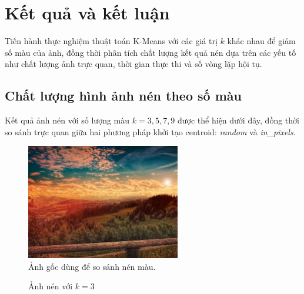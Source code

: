 \section{Kết quả và kết luận}

Tiến hành thực nghiệm thuật toán K-Means với các giá trị \(k\) khác nhau để giảm số màu của ảnh, đồng thời phân tích chất lượng kết quả nén dựa trên các yếu tố như chất lượng ảnh trực quan, thời gian thực thi và số vòng lặp hội tụ.

\subsection{Chất lượng hình ảnh nén theo số màu}

Kết quả ảnh nén với số lượng màu \(k=3, 5, 7, 9\) được thể hiện dưới đây, đồng thời so sánh trực quan giữa hai phương pháp khởi tạo centroid: \textit{random} và \textit{in\_pixels}.

\begin{figure}[H]
  \centering
  \includegraphics[width=0.6\textwidth]{imgs/original.jpg}
  \caption{Ảnh gốc dùng để so sánh nén màu.}
  \label{fig:original}
\end{figure}

\begin{figure}[H]
  \centering
  \hfill
  \caption{Ảnh nén với \(k=3\)}
  \label{fig:k3}
\end{figure}

